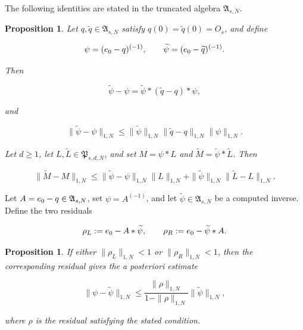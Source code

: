 \documentclass[3p,12pt,authoryear]{elsarticle}
\newtheorem{proposition}[theorem]{Proposition}
\theoremstyle{definition}
\theoremstyle{remark}
\newcommand{\ez}{e_{\mathstrut 0}}
\begin{document}
The following identities are stated in the truncated algebra $\mathfrak A_{s,N}$.

\begin{proposition}\label{prop:perturbation}
Let $q,\widetilde q\in\mathfrak A_{s,N}$ satisfy $q(0)=\widetilde q(0)=O_s$, and define

\begin{equation*}
\psi=(\ez-q)^{(-1)},
\qquad
\widetilde\psi=(\ez-\widetilde q)^{(-1)}.
\end{equation*}

Then

\begin{equation}\label{eq:resolvent-identity}
\widetilde\psi-\psi
=
\widetilde\psi*(\widetilde q-q)*\psi,
\end{equation}

and

\begin{equation}\label{eq:perturbation-bound}
\|\widetilde\psi-\psi\|_{1,N}
\leq
\|\widetilde\psi\|_{1,N}
\|\widetilde q-q\|_{1,N}
\|\psi\|_{1,N}.
\end{equation}

Let $d\geq1$, let $L,\widetilde L\in\mathfrak P_{s,d,N}$, and set $M=\psi*L$ and $\widetilde M=\widetilde\psi*\widetilde L$. Then

\begin{equation}\label{eq:functional-perturbation}
\|\widetilde M-M\|_{1,N}
\leq
\|\widetilde\psi-\psi\|_{1,N}\|L\|_{1,N}
+
\|\widetilde\psi\|_{1,N}\|\widetilde L-L\|_{1,N}.
\end{equation}

\end{proposition}

Let $A=\ez-q\in\mathfrak A_{s,N}$, set
$\psi=A^{(-1)}$, and let
$\widetilde\psi\in\mathfrak A_{s,N}$ be a computed inverse.
 Define the two residuals

\begin{equation*}
\rho_L:=\ez-A*\widetilde\psi,
\qquad
\rho_R:=\ez-\widetilde\psi*A.
\end{equation*}


\begin{proposition}\label{prop:residual}
If either $\|\rho_L\|_{1,N}<1$ or $\|\rho_R\|_{1,N}<1$, then the corresponding residual gives the a posteriori estimate

\begin{equation}\label{eq:residual-bound}
\|\psi-\widetilde\psi\|_{1,N}
\leq
\frac{\|\rho\|_{1,N}}{1-\|\rho\|_{1,N}}
\|\widetilde\psi\|_{1,N},
\end{equation}

where $\rho$ is the residual satisfying the stated condition.
\end{proposition}
\end{document}
